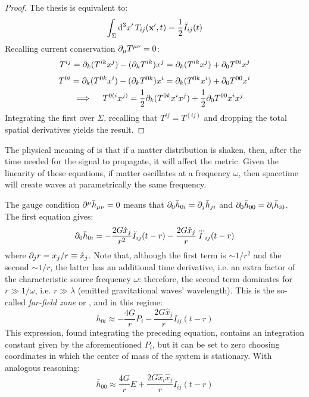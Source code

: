 \begin{proofbox}
  \begin{proof}
    The thesis is equivalent to:
    \begin{equation*}
      \int_\Sigma \mathrm{d}^3 x'\, T_{ij}(\mathbf{x}',t) = \frac{1}{2} \ddot{I}_{ij}(t)
    \end{equation*}
    Recalling current conservation $ \partial_\mu T^{\mu \nu} = 0 $:
    \begin{equation*}
      T^{ij} = \partial_k (T^{ik} x^j) - (\partial_k T^{ik}) x^j = \partial_k (T^{ik} x^j) + \partial_0 T^{0i} x^j
    \end{equation*}
    \begin{multline*}
      T^{0i} = \partial_k (T^{0k} x^i) - (\partial_k T^{0k}) x^i = \partial_k (T^{0k} x^i) + \partial_0 T^{00} x^i \\
      \quad \implies \quad
      T^{0(i} x^{j)} = \frac{1}{2} \partial_k (T^{0k} x^i x^j) + \frac{1}{2} \partial_0 T^{00} x^i x^j
    \end{multline*}
    Integrating the first over $ \Sigma $, recalling that $ T^{ij} = T^{(ij)} $ and dropping the total spatial derivatives yields the result.
  \end{proof}
\end{proofbox}

The physical meaning of  is that if a matter distribution is shaken, then, after the time needed for the signal to propagate, it will affect the metric. Given the linearity of these equations, if matter oscillates at a frequency $ \omega $, then spacetime will create waves at parametrically the same frequency.

The gauge condition $ \partial^\mu \bar{h}_{\mu \nu} = 0 $ means that $ \partial_0 \bar{h}_{0i} = \partial_j \bar{h}_{ji} $ and $ \partial_0 \bar{h}_{00} = \partial_i \bar{h}_{i0} $. The first equation gives:
\begin{equation*}
  \partial_0 \bar{h}_{0i} = - \frac{2G \hat{x}_j}{r^2} \ddot{I}_{ij}(t - r) - \frac{2G \hat{x}_j}{r} \dddot{I}_{ij}(t - r)
\end{equation*}
where $ \partial_j r = x_j / r \equiv \hat{x}_j $. Note that, although the first term is $ \sim 1/r^2 $ and the second $ \sim 1/r $, the latter has an additional time derivative, i.e. an extra factor of the characteristic source frequency $ \omega $: therefore, the second term dominates for $ r \gg 1/\omega $, i.e. $ r \gg \lambda $ (emitted gravitational waves' wavelength). This is the so-called \textit{far-field zone} or , and in this regime:
\begin{equation}
  \bar{h}_{0i} \approx - \frac{4G}{r} P_i - \frac{2G \hat{x}_j}{r} \ddot{I}_{ij} (t - r)
\end{equation}
This expression, found integrating the preceding equation, contains an integration constant given by the aforementioned $ P_i $, but it can be set to zero choosing coordinates in which the center of mass of the system is stationary. With analogous reasoning:
\begin{equation}
  \bar{h}_{00} \approx \frac{4G}{r} E + \frac{2G \hat{x}_i \hat{x}_j}{r} \ddot{I}_{ij} (t - r)
\end{equation}

